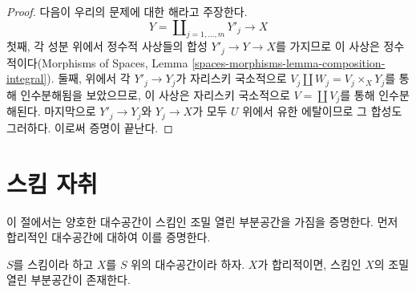 \begin{proof}
\medskip\noindent
다음이 우리의 문제에 대한 해라고 주장한다.
$$
Y = \coprod\nolimits_{j = 1, \ldots, m} Y'_j \longrightarrow X
$$
첫째, 각 성분 위에서 정수적 사상들의 합성
$Y'_j \to Y \to X$를 가지므로 이 사상은 정수적이다(Morphisms of
Spaces, Lemma \ref{spaces-morphisms-lemma-composition-integral}).
둘째, 위에서 각 $Y'_j \to Y_j$가 자리스키 국소적으로
$V_j \amalg W_j = V_j \times_X Y_j$를 통해 인수분해됨을 보았으므로,
이 사상은 자리스키 국소적으로 $V = \coprod V_j$를 통해 인수분해된다.
마지막으로 $Y'_j \to Y_j$와 $Y_j \to X$가 모두 $U$ 위에서
유한 에탈이므로 그 합성도 그러하다. 이로써 증명이 끝난다.
\end{proof}


\section{스킴 자취}
\label{section-schematic}

\noindent
이 절에서는 양호한 대수공간이 스킴인 조밀 열린 부분공간을 가짐을
증명한다. 먼저 합리적인 대수공간에 대하여 이를 증명한다.

\begin{proposition}
\label{proposition-reasonable-open-dense-scheme}
$S$를 스킴이라 하고 $X$를 $S$ 위의 대수공간이라 하자.
$X$가 합리적이면, 스킴인 $X$의 조밀 열린 부분공간이 존재한다.
\end{proposition}


